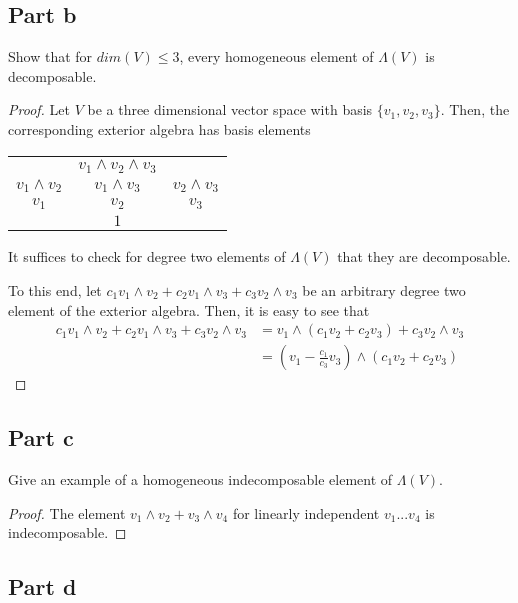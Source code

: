 \documentclass[paper=a4, fontsize=11pt]{scrartcl} %
\numberwithin{equation}{section} %
\numberwithin{figure}{section} %
\numberwithin{table}{section} %
\begin{document}
\subsection*{Part b}

Show that for $dim(V) \leq 3$, every homogeneous element of $\Lambda (V)$ is decomposable.

\begin{proof}

Let $V$ be a three dimensional vector space with basis $\{v_1, v_2, v_3\}$.
Then, the corresponding exterior algebra has basis elements
\\
\begin{center}
\begin{tabular}{c c c}
                & $v_1 \wedge v_2 \wedge v_3$ &\\
$v_1 \wedge v_2$  & $v_1 \wedge v_3$  & $v_2 \wedge v_3$\\
$v_1$             & $v_2$               & $v_3$\\
                  & $1$ &
\end{tabular}
\end{center}

It suffices to check for degree two elements of $\Lambda(V)$ that they are decomposable.

To this end, let $c_1 v_1 \wedge v_2 + c_2 v_1 \wedge v_3 + c_3 v_2 \wedge v_3$ be an arbitrary
degree two element of the exterior algebra.
Then, it is easy to see that 
\[
\begin{aligned}
c_1 v_1 \wedge v_2 + c_2 v_1 \wedge v_3 + c_3 v_2 \wedge v_3 & = v_1 \wedge (c_1 v_2 + c_2 v_3) + c_3 v_2 \wedge v_3\\
& = (v_1 -\frac{c_1}{c_3}v_3) \wedge (c_1v_2 + c_2v_3)
\end{aligned}
\]

\end{proof}

\subsection*{Part c}

Give an example of a homogeneous indecomposable element of $\Lambda(V)$.

\begin{proof}
The element $v_1 \wedge v_2 + v_3 \wedge v_4$ for linearly independent $v_1...v_4$ is indecomposable.
\end{proof}

\subsection*{Part d}
\end{document}
